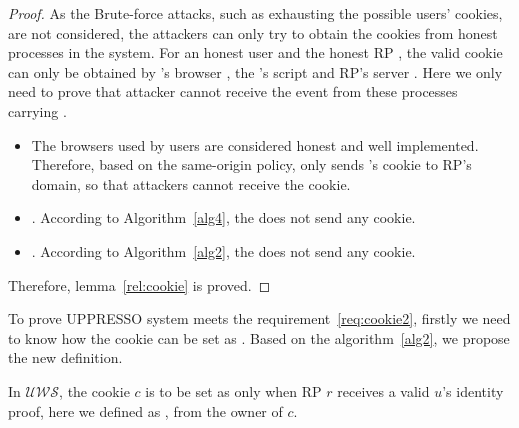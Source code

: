 \begin{appendices}
\begin{proof}
As the Brute-force attacks, such as exhausting the possible users' cookies, are not  considered, the attackers can only try to obtain the cookies from honest processes in the system.  For an honest user  and the honest RP , the valid cookie  can only be obtained by 's browser , the 's script  and RP's server  . 
Here we only need to prove that attacker cannot receive the event from these processes carrying .
\begin{itemize}
\item {} The browsers used by users are considered honest and well implemented. Therefore, based on the same-origin policy,  only sends 's cookie to RP's domain, so that attackers cannot receive the cookie.
\item {}. According to Algorithm~\ref{alg4}, the  does not send any cookie. 
\item {}. According to Algorithm~\ref{alg2}, the  does not send any cookie. 
\end{itemize}
Therefore, lemma~\ref{rel:cookie} is proved.
\end{proof}

To prove UPPRESSO system meets the requirement~\ref{req:cookie2}, firstly we need to know how the cookie can be set as . Based on the algorithm~\ref{alg2}, we propose the new definition.
\begin{redef}
In $\mathcal{UWS}$, the cookie $c$ is to be set as only when RP $r$ receives a valid $u$'s identity proof, here we defined as , from the owner of $c$. 
\label{red:token}
\end{redef}


\end{appendices}
